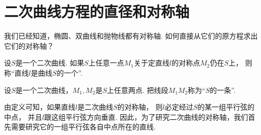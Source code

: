 \section{二次曲线方程的直径和对称轴}
我们已经知道，椭圆、双曲线和抛物线都有对称轴.
如何直接从它们的原方程求出它们的对称轴？

\begin{definition}
设\(S\)是一个二次曲线.
如果\(S\)上任意一点\(M_1\)关于定直线\(l\)的对称点\(M_2\)仍在\(S\)上，
则称“直线\(l\)是曲线\(S\)的一个”.
\end{definition}

\begin{definition}
设\(S\)是一个二次曲线，\(M_1,M_2\)是\(S\)上任意两点.
把线段\(M_1 M_2\)称为“\(S\)的一条”.
\end{definition}

由定义可知，如果直线\(l\)是二次曲线\(S\)的对称轴，
则\(l\)必定经过\(S\)的某一组平行弦的中点，
并且\(l\)跟这组平行弦方向垂直.
因此，为了研究二次曲线的对称轴，我们首先需要研究它的一组平行弦各自中点所在的直线.

